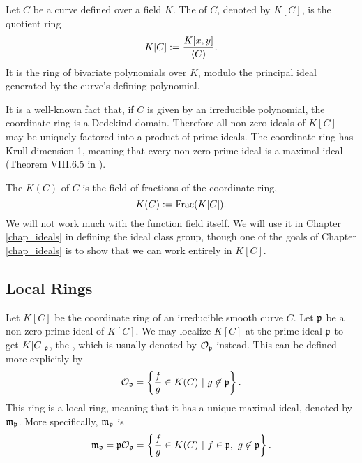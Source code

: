 Let $C$ be a curve defined over a field $K$.
The  of $C$, denoted by $K[C]$, is the quotient ring
\[ K[C] := \frac {K[x,y]} {\pid{C}}. \]
It is the ring of bivariate polynomials over $K$,
modulo the principal ideal generated by the curve's defining polynomial.

It is a well-known fact that, if $C$ is given by an irreducible polynomial, the coordinate ring is a Dedekind domain.
Therefore all non-zero ideals of $K[C]$ may be uniquely factored into a product of prime ideals.
The coordinate ring has Krull dimension 1, meaning that every non-zero prime ideal is a maximal ideal
(Theorem VIII.6.5 in \cite{hungerford}).



The  $K(C)$ of $C$ is the field of fractions of the coordinate ring,
\[ K(C) := \Frac(K[C]). \]
We will not work much with the function field itself.
We will use it in Chapter \ref{chap_ideals} in defining the ideal class group,
though one of the goals of Chapter \ref{chap_ideals} is to show that we can work entirely in $K[C]$.




\subsection{Local Rings}
\label{sec_local_rings}

Let $K[C]$ be the coordinate ring of an irreducible smooth curve $C$.
Let $\frak p$ be a non-zero prime ideal of $K[C]$.
We may localize $K[C]$ at the prime ideal $\frak p$ to get $K[C]_{\frak p}$,
the ,
which is usually denoted by $\cal O_\frak p$ instead.
This can be defined more explicitly by
\[ \cal O_{\frak p} = \left\{ \frac f g \in K(C) ~|~ g \not \in \frak p \right\}. \]
This ring is a local ring, meaning that it has a unique maximal ideal, denoted by $\frak m_{\frak p}$.
More specifically, $\frak m_{\frak p}$ is 
\[ \frak m_{\frak p} = \frak p \cal O_{\frak p} =
   \left\{ \frac f g \in K(C) ~|~ f \in \frak p, ~g \not \in \frak p \right\}. \]

